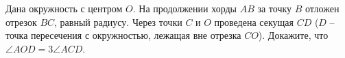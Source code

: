 \begin{ex}
	\begin{condition}
		Дана окружность с центром \( O \). На продолжении хорды \( AB  \) за точку \( B  \) отложен отрезок \( BC \), равный радиусу. Через точки \( C  \) и \( O  \) проведена секущая \( CD  \) (\( D \) – точка пересечения с окружностью, лежащая вне отрезка \( CO \)). Докажите, что \( \angle AOD = 3\angle ACD \).
	\end{condition}
\end{ex}